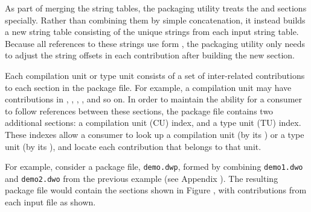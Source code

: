 As part of merging the string tables, the packaging utility
treats the \dotdebugstrdwo{} and \dotdebugstroffsetsdwo{}
sections specially. Rather than
combining them by simple concatenation, it instead builds a new
string table consisting of the unique strings from each input
string table. Because all references to these strings use
form \DWFORMstrx{},
the packaging utility only needs to adjust the
string offsets in each \dotdebugstroffsetsdwo{} contribution after
building the new \dotdebugstrdwo{} section.

Each compilation unit or type unit consists of a set of
inter-related contributions to each section in the package file.
For example, a compilation unit may have contributions in
\dotdebuginfodwo{}, \dotdebugabbrevdwo{}, \dotdebuglinedwo{},
\dotdebugstroffsetsdwo{}, and so on. In order to maintain the ability 
for a consumer to follow references between these sections, the
package file contains two additional sections: a compilation unit
(CU) index, and a type unit (TU) index. These indexes allow a
consumer to look up a compilation unit (by its \CUsignature) or 
a type unit (by its \TUsignature), and locate each contribution 
that belongs to that unit.

For example, consider a package file, \texttt{demo.dwp}, formed by
combining \texttt{demo1.dwo} and \texttt{demo2.dwo} from the previous example
(see Appendix ). The
resulting package file would contain the sections shown in Figure
, 
with contributions from each input file as shown.

